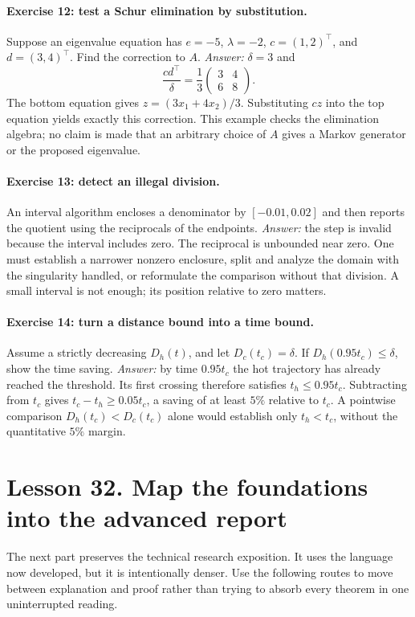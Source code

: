 \documentclass[11pt]{article}
\begin{document}
\paragraph{Exercise 12: test a Schur elimination by substitution.}
Suppose an eigenvalue equation has $e=-5$, $\lambda=-2$,
$c=(1,2)^\top$, and $d=(3,4)^\top$. Find the correction to $A$.
\emph{Answer:} $\delta=3$ and
\[
\frac{cd^\top}{\delta}
=\frac13\begin{pmatrix}3&4\\6&8\end{pmatrix}.
\]
The bottom equation gives $z=(3x_1+4x_2)/3$.
Substituting $cz$ into the top equation yields exactly this correction.
This example checks the elimination algebra; no claim is made that an
arbitrary choice of $A$ gives a Markov generator or the proposed eigenvalue.

\paragraph{Exercise 13: detect an illegal division.}
An interval algorithm encloses a denominator by $[-0.01,0.02]$ and then
reports the quotient using the reciprocals of the endpoints.
\emph{Answer:} the step is invalid because the interval includes zero.
The reciprocal is unbounded near zero. One must establish a narrower
nonzero enclosure, split and analyze the domain with the singularity
handled, or reformulate the comparison without that division. A small
interval is not enough; its position relative to zero matters.

\paragraph{Exercise 14: turn a distance bound into a time bound.}
Assume a strictly decreasing $D_h(t)$, and let $D_c(t_c)=\delta$.
If $D_h(0.95t_c)\leq\delta$, show the time saving.
\emph{Answer:} by time $0.95t_c$ the hot trajectory has already reached
the threshold. Its first crossing therefore satisfies
$t_h\leq0.95t_c$. Subtracting from $t_c$ gives
$t_c-t_h\geq0.05t_c$, a saving of at least $5\%$ relative to $t_c$.
A pointwise comparison $D_h(t_c)<D_c(t_c)$ alone would establish only
$t_h<t_c$, without the quantitative $5\%$ margin.

\clearpage
\section*{Lesson 32. Map the foundations into the advanced report}
The next part preserves the technical research exposition. It uses the
language now developed, but it is intentionally denser. Use the following
routes to move between explanation and proof rather than trying to absorb
every theorem in one uninterrupted reading.
\end{document}
